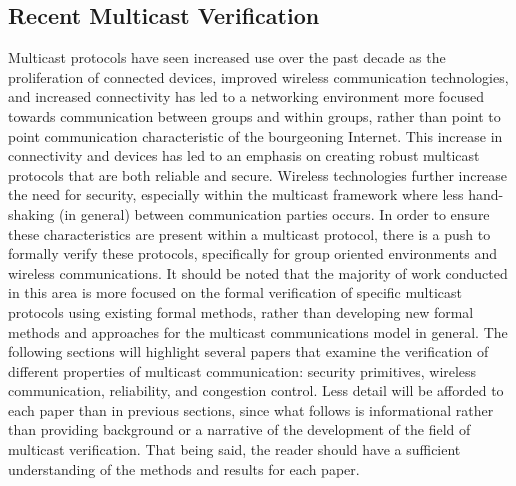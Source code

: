 \documentclass[12pt, fullpage]{article}
\begin{document}
\subsection{Recent Multicast Verification}
Multicast protocols have seen increased use over the past decade as the proliferation of connected devices, improved wireless communication technologies, and increased connectivity has led to a networking environment more focused towards communication between groups and within groups, rather than point to point communication characteristic of the bourgeoning Internet. This increase in connectivity and devices has led to an emphasis on creating robust multicast protocols that are both reliable and secure. Wireless technologies further increase the need for security, especially within the multicast framework where less hand-shaking (in general) between communication parties occurs. In order to ensure these characteristics are present within a multicast protocol, there is a push to formally verify these protocols, specifically for group oriented environments and wireless communications. It should be noted that the majority of work conducted in this area is more focused on the formal verification of specific multicast protocols using existing formal methods, rather than developing new formal methods and approaches for the multicast communications model in general.
\bigbreak
The following sections will highlight several papers that examine the verification of different properties of multicast communication: security primitives, wireless communication, reliability, and congestion control. Less detail will be afforded to each paper than in previous sections, since what follows is informational rather than providing background or a narrative of the development of the field of multicast verification. That being said, the reader should have a sufficient understanding of the methods and results for each paper.
\bigbreak
\end{document}
